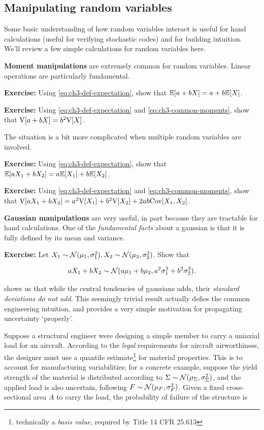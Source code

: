 \documentclass[../primer.tex]{subfiles}
\begin{document}
\subsection{Manipulating random variables}
Some basic understanding of how random variables interact is useful for hand
calculations (useful for verifying stochastic codes) and for building intuition.
We'll review a few simple calculations for random variables here.

\textbf{Moment manipulations} are extremely common for random variables. Linear
operations are particularly fundamental.

\textbf{Exercise:} Using \eqref{eq:ch3-def-expectation}, show that $\mathbb{E}[a + bX] =
a + b \mathbb{E}[X]$.

\textbf{Exercise:} Using \eqref{eq:ch3-def-expectation} and
\eqref{eq:ch3-common-moments}, show that $\mathrm{V}[a + bX] = b^2 \mathrm{V}[X]$.

The situation is a bit more complicated when multiple random variables are
involved.

\textbf{Exercise:} Using \eqref{eq:ch3-def-expectation}, show that $\mathbb{E}[aX_1 +
  bX_2] = a \mathbb{E}[X_1] + b \mathbb{E}[X_2]$.

\textbf{Exercise:} Using \eqref{eq:ch3-def-expectation} and
\eqref{eq:ch3-common-moments}, show that $\mathrm{V}[aX_1 + bX_2] = a^2 \mathrm{V}[X_1] + b^2
\mathrm{V}[X_2] + 2ab \mathrm{Cov}[X_1,X_2]$.

\textbf{Gaussian manipulations} are very useful, in part because they are
tractable for hand calculations. One of the \emph{fundamental facts} about a
gaussian is that it is fully defined by its mean and variance.

\textbf{Exercise:} Let $X_1\sim\mathcal{N}(\mu_1, \sigma_1^2), X_2\sim\mathcal{N}(\mu_2,
\sigma_2^2)$. Show that

\begin{equation} \label{eq:ch3-add-normal}
  a X_1 + b X_2 \sim \mathcal{N}(a \mu_1 + b \mu_2, a^2 \sigma_1^2 + b^2 \sigma_2^2).
\end{equation}

\noindent {} shows us that while the central tendencies of
gaussians adds, their \emph{standard deviations do not add}. This seemingly
trivial result actually defies the common engineering intuition, and provides a
very simple motivation for propagating uncertainty `properly'.

Suppose a structural engineer were designing a simple member to carry a uniaxial
load for an aircraft. According to the \emph{legal} requirements for aircraft
airworthiness, the designer must use a quantile estimate\footnote{technically a
  \emph{basis value}, required by Title 14 CFR 25.613} for material properties.
This is to account for manufacturing variabilities; for a concrete example,
suppose the yield strength of the material is distributed according to
$\Sigma\sim\mathcal{N}(\mu_{\Sigma}, \sigma_{\Sigma}^2)$, and the applied load is also
uncertain, following $F\sim\mathcal{N}(\mu_F, \sigma_F^2)$. Given a fixed
cross-sectional area $A$ to carry the load, the probability of failure of the
structure is
\end{document}

